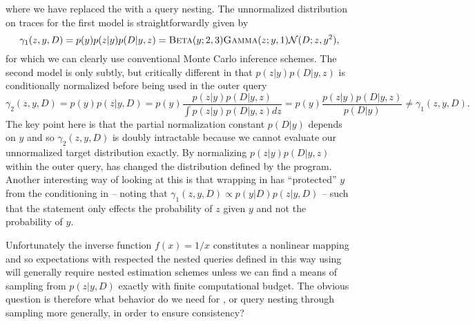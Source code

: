 \vspace{-15pt}
where we have replaced the  with a query nesting.  The unnormalized distribution on
traces for the first model is straightforwardly given by
\[
\gamma_1(z,y,D) = p(y)p(z|y)p(D|y,z) = \textsc{Beta}(y;2,3) \textsc{Gamma}(z;y,1) \mathcal{N}(D;z,y^2),
\]
for which we can clearly use conventional Monte Carlo inference schemes.  The second model
is only subtly, but critically different in that $p(z|y)p(D|y,z)$ is conditionally normalized 
before being used in the outer query
\[
\gamma_2(z,y,D) = p(y)p(z|y,D) = p(y)\frac{p(z|y)p(D|y,z)}{\int p(z|y)p(D|y,z)dz} = p(y)\frac{p(z|y)p(D|y,z)}{p(D|y)} \neq \gamma_1(z,y,D).
\]
The key point here is that the partial normalization constant $p(D|y)$ depends on $y$ and so 
$\gamma_2(z,y,D)$ is doubly intractable because we cannot evaluate our unnormalized target
distribution exactly.  By normalizing $p(z|y)p(D|y,z)$ within the outer query, 
 \conditional has changed the distribution defined by the program.  Another interesting way of looking at this
 is that wrapping  in \conditional has ``protected'' $y$ from the conditioning 
 in  -- noting
 that $\gamma_1 (z,y,D) \propto p(y|D)p(z|y,D)$ -- such that the \observe statement only effects the probability
 of $z$ given $y$ and not the probability of $y$.
 
 Unfortunately the inverse function $f(x) = 1/x$ constitutes
a nonlinear mapping and so expectations with respected the nested queries defined in this way using
\conditional will generally require nested estimation schemes unless we can find a means of
sampling from $p(z|y,D)$ exactly with finite computational budget.
The obvious question is therefore what behavior do we need for \conditional, or query nesting through sampling
more generally, in order to ensure consistency?  

